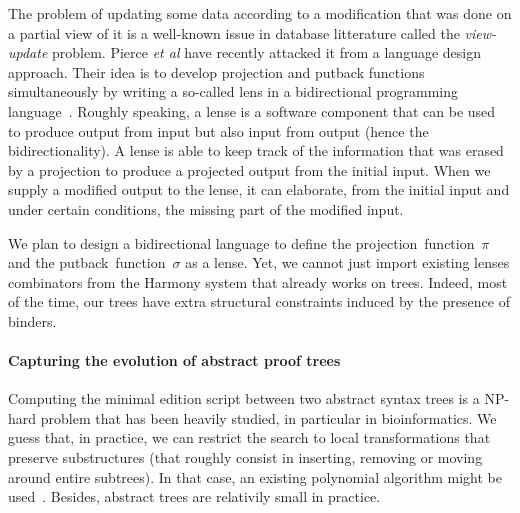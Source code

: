 \documentclass{article}
\newcommand{\remtext}[1]{}
\begin{document}
The problem of updating some data according to a modification that was
done on a partial view of it is a well-known issue in database
litterature called the \textit{view-update} problem. Pierce \textit{et
  al} have recently attacked it from a language design approach. Their
idea is to develop projection and putback functions simultaneously by
writing a so-called lens in a bidirectional programming
language~\cite{pierce-bidirectional}. Roughly speaking, a lense is a
software component that can be used to produce output from input but
also input from output (hence the bidirectionality). A lense is able
to keep track of the information that was erased by a projection to
produce a projected output from the initial input. When we supply a
modified output to the lense, it can elaborate, from the initial input
and under certain conditions, the missing part of the modified input. 

We plan to design a bidirectional language to define the
projection~function~$\pi$ and the putback~function~$\sigma$ as a
lense. Yet, we cannot just import existing lenses combinators from the
Harmony system that already works on trees. Indeed, most of the time,
our trees have extra structural constraints induced by the presence of
binders. 

\remtext{Fri Jun 18, 2010 1:46 PM. Autre point important sur les vues
  concrètes~: elles peuvent servir à parler de l'historique.  Voir le
  module MetaAST de l'implémentation. Ces vues sont utiles par exemple
  lorsque l'utilisateur doit construire un patch d'adaptation. Il a
  alors toute la puissance des métathéorèmes ainsi que tous les objets
  déjà construits pour décrire son patch.}

\paragraph{Capturing the evolution of abstract proof trees}
\-

Computing the minimal edition script between two abstract syntax trees
is a NP-hard problem that has been heavily studied, in particular in
bioinformatics.  We guess that, in practice, we can restrict the
search to local transformations that preserve substructures (that
roughly consist in inserting, removing or moving around entire
subtrees). In that case, an existing polynomial algorithm might be
used~\cite{REF!}. Besides, abstract trees are relativily small in
practice. 
\end{document}
